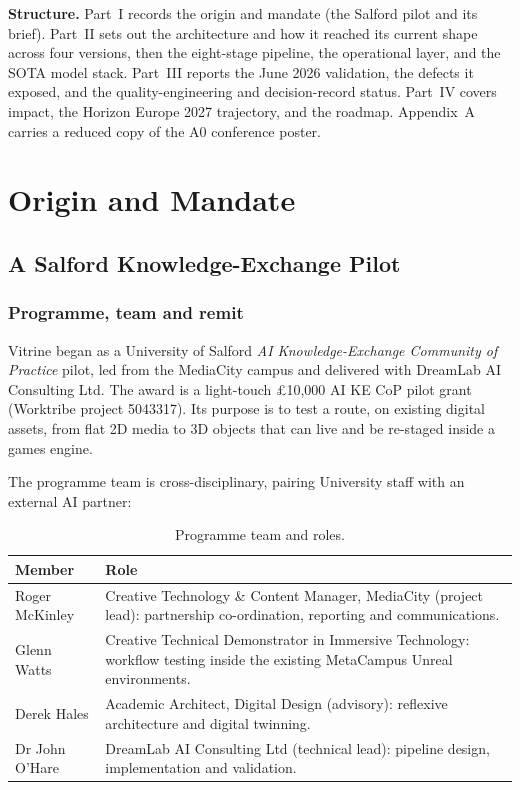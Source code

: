 \documentclass[a4paper,11pt]{report}
\begin{document}
\textbf{Structure.} Part~I records the origin and mandate (the Salford pilot and its brief). Part~II sets
out the architecture and how it reached its current shape across four versions, then the eight-stage
pipeline, the operational layer, and the SOTA model stack. Part~III reports the June 2026 validation, the
defects it exposed, and the quality-engineering and decision-record status. Part~IV covers impact, the
Horizon Europe 2027 trajectory, and the roadmap. Appendix~A carries a reduced copy of the A0 conference
poster.

\tableofcontents
\listoffigures
\listoftables

\cleardoublepage
{}

\part{Origin and Mandate}

\chapter{A Salford Knowledge-Exchange Pilot}

\section{Programme, team and remit}
Vitrine began as a University of Salford \emph{AI Knowledge-Exchange Community of Practice} pilot, led from
the MediaCity campus and delivered with DreamLab AI Consulting Ltd. The award is a light-touch
\pounds10{,}000 AI KE CoP pilot grant (Worktribe project 5043317). Its purpose is to test a route, on
existing digital assets, from flat 2D media to 3D objects that can live and be re-staged inside a games
engine.

The programme team is cross-disciplinary, pairing University staff with an external AI partner:

\begin{table}[h]
\centering\small
\caption{Programme team and roles.}\label{tab:team}
\begin{tabularx}{\textwidth}{L{0.32\textwidth} X}
\toprule
\textbf{Member} & \textbf{Role} \\
\midrule
Roger McKinley & Creative Technology \& Content Manager, MediaCity (project lead): partnership co-ordination, reporting and communications. \\
Glenn Watts & Creative Technical Demonstrator in Immersive Technology: workflow testing inside the existing MetaCampus Unreal environments. \\
Derek Hales & Academic Architect, Digital Design (advisory): reflexive architecture and digital twinning. \\
Dr John O'Hare & DreamLab AI Consulting Ltd (technical lead): pipeline design, implementation and validation. \\
\bottomrule
\end{tabularx}
\end{table}
\end{document}
